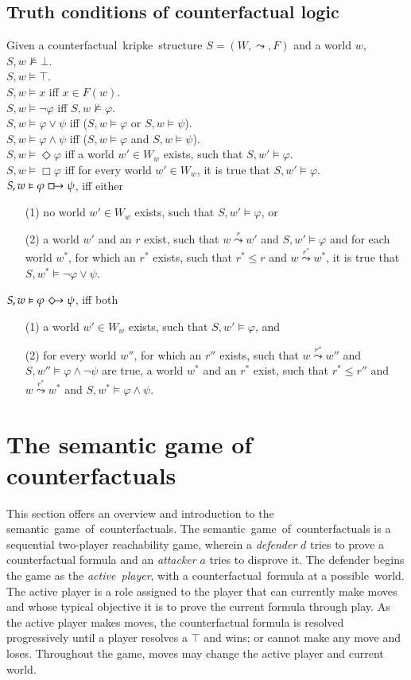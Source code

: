 \documentclass[a4paper,american]{paper}
\theoremstyle{definition}\newtheorem{definition}{Definition}
\begin{document}
\subsection{Truth conditions of counterfactual logic}
Given a counterfactual~kripke~structure $S = (W, \leadsto ,F)$ and a world $w$,\\
$S,w\nvDash\bot$.\\
$S,w\vDash\top$.\\
$S,w\vDash x$ iff $x\in F(w)$.\\
$S,w\vDash \neg\varphi$ iff $S,w\nvDash\varphi$.\\
$S,w\vDash \varphi\vee\psi$ iff ($S,w\vDash\varphi$ or $S,w\vDash\psi$).\\
$S,w\vDash \varphi\wedge\psi$ iff ($S,w\vDash\varphi$ and $S,w\vDash\psi$).\\
$S,w\vDash \Diamond \varphi$ iff a world $w'\in W_w$ exists, such that $S,w' \vDash \varphi$.\\
$S,w\vDash \Box \varphi$ iff for every world $w'\in W_w$, it is true that $S,w' \vDash \varphi$.\\
$S,w \vDash \varphi \boxright \psi$, iff either
\begin{itemize}
	\item[(1)] no world $w'\in W_w$ exists, such that $S,w' \vDash \varphi$, or
	\item[(2)] a world $w'$ and an $r$ exist, such that $w\overset{r}{\leadsto} w'$ and $S,w'\vDash \varphi$ and for each world $w^*$, for which an $r^*$ exists, such that $r^*\leq r$ and $w\overset{r^*}{\leadsto} w^*$, it is true that $S,w^*\vDash\neg\varphi\vee\psi$.
\end{itemize}
\noindent$S,w\vDash \varphi \Diamondright \psi$, iff both 
\begin{itemize}
	\item[(1)] a world $w'\in W_w$ exists, such that $S,w' \vDash \varphi$, and
	\item[(2)] for every world $w''$, for which an $r''$ exists, such that $w\overset{r''}{\leadsto}w''$ and $S,w'' \vDash \varphi\wedge\neg\psi$ are true, a world $w^*$ and an $r^*$ exist, such that $r^* \leq r''$ and $w\overset{r^*}{\leadsto}w^*$ and $S,w^* \vDash \varphi\wedge\psi$.
\end{itemize}
\section{The semantic game of counterfactuals}
This section offers an overview and introduction to the semantic~game~of~counterfactuals. The semantic~game~of~counterfactuals is a sequential two-player reachability game, wherein a \textit{defender} $d$ tries to prove a counterfactual formula and an \textit{attacker} $a$ tries to disprove it. The defender begins the game as the \textit{active~player}, with a counterfactual~formula at a possible~world. The active player is a role assigned to the player that can currently make moves and whose typical objective it is to prove the current formula through play. As the active player makes moves, the counterfactual formula is resolved progressively until a player resolves a $\top$ and wins; or cannot make any move and loses. Throughout the game, moves may change the active player and current world.
\end{document}
